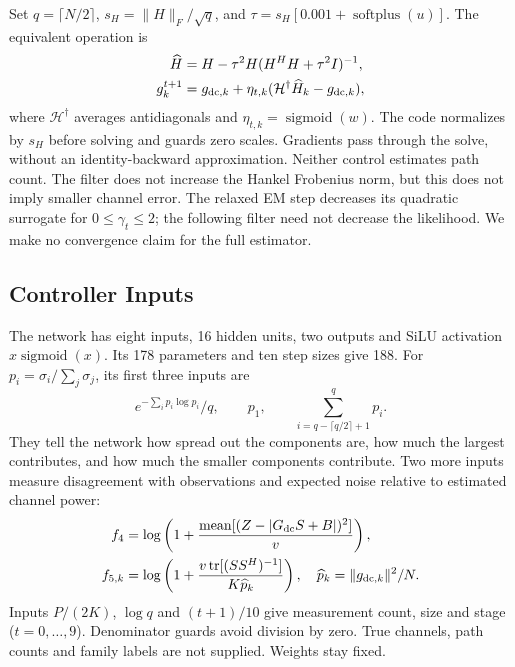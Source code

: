 \documentclass[journal]{IEEEtran}
\newcommand{\Hank}{\mathcal{H}}
\DeclareMathOperator{\sigmoid}{sigmoid}
\DeclareMathOperator{\softplus}{softplus}
\DeclareMathOperator{\tr}{tr}
\begin{document}
Set $q=\lceil N/2\rceil$, $s_H=\|H\|_F/\sqrt q$, and
$\tau=s_H[0.001+\softplus(u)]$. The equivalent operation is
\begin{align}
 \widehat H&=H-\tau^2H(H^HH+\tau^2I)^{-1},\\
 g_k^{t+1}&=g_{{\rm dc},k}+\eta_{t,k}
 (\Hank^\dagger\widehat H_k-g_{{\rm dc},k}),
\end{align}
where $\Hank^\dagger$ averages antidiagonals and
$\eta_{t,k}=\sigmoid(w)$. The code normalizes by $s_H$ before solving and
guards zero scales. Gradients pass through the solve, without an
identity-backward approximation. Neither control estimates path count.
The filter does not increase the Hankel Frobenius norm, but this does not imply
smaller channel error. The relaxed EM step decreases its quadratic
surrogate for $0\le\gamma_t\le2$; the following filter need not decrease
the likelihood. We make no convergence claim for the full estimator.

\subsection{Controller Inputs}
The network has eight inputs, 16 hidden units, two outputs and SiLU
activation $x\sigmoid(x)$. Its 178 parameters and ten step sizes give 188. For
$p_i=\sigma_i/\sum_j\sigma_j$, its first
three inputs are
\begin{equation}
 e^{-\sum_i p_i\log p_i}/q,\qquad p_1,\qquad
 \sum_{i=q-\lceil q/2\rceil+1}^{q}p_i.
\end{equation}
They tell the network how spread out the components are, how much the
largest contributes, and how much the smaller components contribute.
Two more inputs measure disagreement with observations and expected
noise relative to estimated channel power:
\begin{align}
 f_4&=\log\left(1+\frac{\operatorname{mean}[(Z-|G_{\rm dc}S+B|)^2]}{v}\right),\\
 f_{5,k}&=\log\left(1+\frac{v\tr[(SS^H)^{-1}]}{K\widehat p_k}\right),
 \quad\widehat p_k=\|g_{{\rm dc},k}\|^2/N.
\end{align}
Inputs $P/(2K)$, $\log q$ and $(t+1)/10$ give measurement count, size and
stage ($t=0,\ldots,9$). Denominator guards avoid division by zero.
True channels, path counts and family labels are not supplied. Weights stay fixed.
\end{document}
